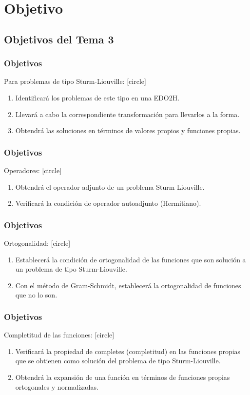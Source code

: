 \documentclass[12pt]{beamer}
\begin{document}
\section{Objetivo}
\subsection{Objetivos del Tema 3}

\begin{frame}
\frametitle{Objetivos}
Para problemas de tipo Sturm-Liouville:
[circle]
\begin{enumerate}[<+->]
\item Identificará los problemas de este tipo en una EDO2H.
\item Llevará a cabo la correspondiente transformación para llevarlos a la forma.
\item Obtendrá las soluciones en términos de valores propios y funciones propias.
\seti
\end{enumerate}
\end{frame}
\begin{frame}
\frametitle{Objetivos}
Operadores:
[circle]
\begin{enumerate}[<+->]
\conti
\item Obtendrá el operador adjunto de un problema Sturm-Liouville.
\item Verificará la condición de operador autoadjunto (Hermitiano).
\seti
\end{enumerate}
\end{frame}
\begin{frame}
\frametitle{Objetivos}
Ortogonalidad:
[circle]
\begin{enumerate}[<+->]
\conti
\item Establecerá la condición de ortogonalidad de las funciones que son solución a un problema de tipo Sturm-Liouville.
\item Con el método de Gram-Schmidt, establecerá la ortogonalidad de funciones que no lo son.
\seti
\end{enumerate}
\end{frame}
\begin{frame}
\frametitle{Objetivos}
Completitud de las funciones:
[circle]
\begin{enumerate}[<+->]
\conti
\item Verificará la propiedad de completes (completitud) en las funciones propias que se obtienen como solución del problema de tipo Sturm-Liouville.
\item Obtendrá la expansión de una función en términos de funciones propias ortogonales y normalizadas.
\end{enumerate}
\end{frame}
\end{document}
